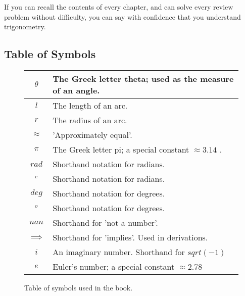 If you can recall the contents of every chapter, and can solve every review problem without difficulty, you can say with confidence that you understand trigonometry.\\

\clearpage
\subsection{Table of Symbols}

\begin{figure}[htb]
\caption{Table of symbols used in the book.}
\label{fig:table_of_symbols}
\begin{center}
\begin{tabular}{ |c| l |}
\hline 
$\theta$ & The Greek letter theta; used as the measure of an angle.\\
\hline 
$l$ & The length of an arc.\\
\hline 
$r$ & The radius of an arc.\\
\hline 
$\approx$ & 'Approximately equal'.\\
\hline 
$\pi$ & The Greek letter pi;  a special constant $\approx 3.14$ .\\
\hline
$rad$ & Shorthand notation for radians.\\
\hline
$^c$ & Shorthand notation for radians.\\
\hline
$deg$ & Shorthand notation for degrees.\\
\hline
$^o$ & Shorthand notation for degrees.\\
\hline
$nan$ & Shorthand for 'not a number'.\\
\hline
$\implies$ & Shorthand for 'implies'.  Used in derivations.\\
\hline
$i$ & An imaginary number.  Shorthand for $sqrt(-1)$\\
\hline
$e$ & Euler's number; a special constant $\approx 2.78$\\
\hline
\end{tabular}
\end{center}
\end{figure}

